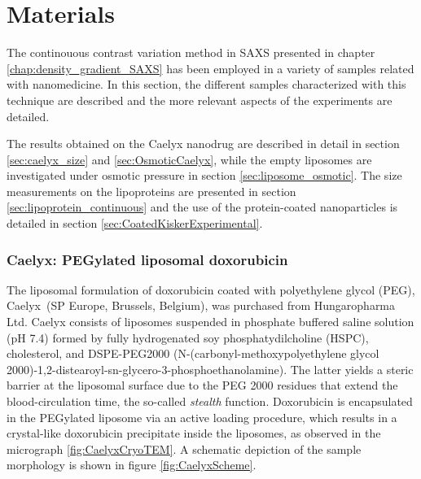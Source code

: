 \section{Materials}

The continouous contrast variation method in SAXS presented in chapter \ref{chap:density_gradient_SAXS} has been employed in a variety of samples related with nanomedicine. In this section, the different samples characterized with this technique are described and the more relevant aspects of the experiments are detailed. 

The results obtained on the Caelyx nanodrug are described in detail in section \ref{sec:caelyx_size} and \ref{sec:OsmoticCaelyx}, while the empty liposomes are investigated under osmotic pressure in section \ref{sec:liposome_osmotic}. The size measurements on the lipoproteins are presented in section \ref{sec:lipoprotein_continuous} and the use of the protein-coated nanoparticles is detailed in section \ref{sec:CoatedKiskerExperimental}.

\subsubsection{Caelyx: PEGylated liposomal doxorubicin}
\label{sec:materials_caelyx}
The liposomal formulation of doxorubicin coated with polyethylene glycol (PEG), Caelyx\textregistered\ (SP Europe, Brussels, Belgium), was purchased from Hungaropharma Ltd. Caelyx consists of liposomes suspended in phosphate buffered saline solution (pH 7.4) formed by fully hydrogenated soy phosphatydilcholine (HSPC), cholesterol, and DSPE-PEG2000 (N-(carbonyl-methoxypolyethylene glycol 2000)-1,2-distearoyl-sn-glycero-3-phosphoethanolamine). The latter yields a steric barrier at the liposomal surface due to the PEG 2000 residues that extend the blood-circulation time, the so-called \emph{stealth} function. Doxorubicin is encapsulated in the PEGylated liposome via an active loading procedure, which results in a crystal-like doxorubicin precipitate inside the liposomes, as observed in the micrograph \ref{fig:CaelyxCryoTEM}. A schematic depiction of the sample morphology is shown in figure \ref{fig:CaelyxScheme}. 


